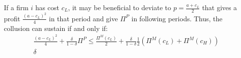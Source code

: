 \documentclass[12pt]{article}
\begin{document}
If a firm $i$ has cost $c_L$, it may be beneficial to deviate to $p=\frac{a+c_L}{2}$ that gives a profit $\frac{(a-c_L)^2}{4}$ in that period and give $\Pi^P$ in following periods. Thus, the collusion can sustain if and only if:
\begin{equation}
    \begin{aligned}
        \frac{(a-c_L)^2}{4}+\frac{\delta}{1-\delta}\Pi^P\leq \frac{\Pi^M(c_L)}{2}+\frac{\delta}{1-\delta}\frac{1}{2}\left(\Pi^M(c_L)+\Pi^M(c_H)\right)\\
        \delta
        \end{aligned}
        \nonumber
\end{equation}
\end{document}
